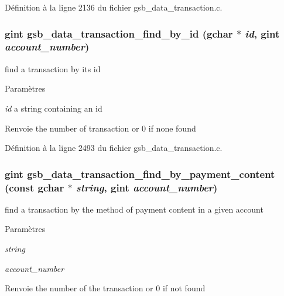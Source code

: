 Définition à la ligne 2136 du fichier gsb\_\-data\_\-transaction.c.

\subsubsection[{gsb\_\-data\_\-transaction\_\-find\_\-by\_\-id}]{\setlength{\rightskip}{0pt plus 5cm}gint gsb\_\-data\_\-transaction\_\-find\_\-by\_\-id (gchar $\ast$ {\em id}, \/  gint {\em account\_\-number})}\label{gsb__data__transaction_8h_a8904a22be0f714a36c52e4924491e959}
find a transaction by its id


\begin{DoxyParams}{Paramètres}
\item[{\em id}]a string containing an id\end{DoxyParams}
\begin{DoxyReturn}{Renvoie}
the number of transaction or 0 if none found 
\end{DoxyReturn}


Définition à la ligne 2493 du fichier gsb\_\-data\_\-transaction.c.

\subsubsection[{gsb\_\-data\_\-transaction\_\-find\_\-by\_\-payment\_\-content}]{\setlength{\rightskip}{0pt plus 5cm}gint gsb\_\-data\_\-transaction\_\-find\_\-by\_\-payment\_\-content (const gchar $\ast$ {\em string}, \/  gint {\em account\_\-number})}\label{gsb__data__transaction_8h_aeb3022dd41bfae50a422aeca94d27d2e}
find a transaction by the method of payment content in a given account


\begin{DoxyParams}{Paramètres}
\item[{\em string}]\item[{\em account\_\-number}]\end{DoxyParams}
\begin{DoxyReturn}{Renvoie}
the number of the transaction or 0 if not found 
\end{DoxyReturn}


